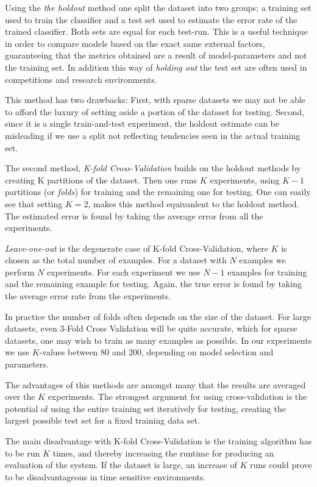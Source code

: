 Using the \textit{the holdout} method one split the dataset into two groups; a
training set used to train the classifier and a test set used to estimate the
error rate of the trained classifier. Both sets are equal for each test-run.
This is a useful technique in order to compare models based on the exact same
external factors, guaranteeing that the metrics obtained are a result of
model-parameters and not the training set. In addition this way of
\textit{holding out} the test set are often used in competitions and research
environments.

This method has two drawbacks: First, with sparse datasets we may not be able
to afford the luxury of setting aside a portion of the dataset for testing.
Second, since it is a single train-and-test experiment, the holdout estimate
can be misleading if we use a split not reflecting tendencies seen in the
actual training set.

The second method, \textit{K-fold Cross-Validation} builds on the holdout
methods by creating K partitions of the dataset. Then one runs $K$ experiments,
using $K-1$ partitions (or \textit{folds}) for training and the remaining one
for testing. One can easily see that setting $K=2$, makes this method
equivanlent to the holdout method. The estimated error is found by taking the
average error from all the experiments.

\textit{Leave-one-out} is the degenerate case of K-fold Cross-Validation, where
$K$ is chosen as the total number of examples. For a dataset with $N$ examples
we perform $N$ experiments. For each experiment we use $N-1$ examples for
training and the remaining example for testing. Again, the true error is found
by taking the average error rate from the experiments.

In practice the number of folds often depends on the size of the dataset. For
large datasets, even 3-Fold Cross Validation will be quite accurate, which for
sparse datasets, one may wish to train as many examples as possible. In our
experiments we use $K$-values between $80$ and $200$, depending on model
selection and parameters.

The advantages of this methods are amongst many that the results are averaged
over the $K$ experiments. The strongest argument for using cross-validation is
the potential of using the entire training set iteratively for testing, creating
the largest possible test set for a fixed training data set.

The main disadvantage with K-fold Cross-Validation is the training algorithm
has to be run $K$ times, and thereby increasing the runtime for producing an
evaluation of the system. If the dataset is large, an increase of $K$ runs
could prove to be disadvantageous in time sensitive environments.

